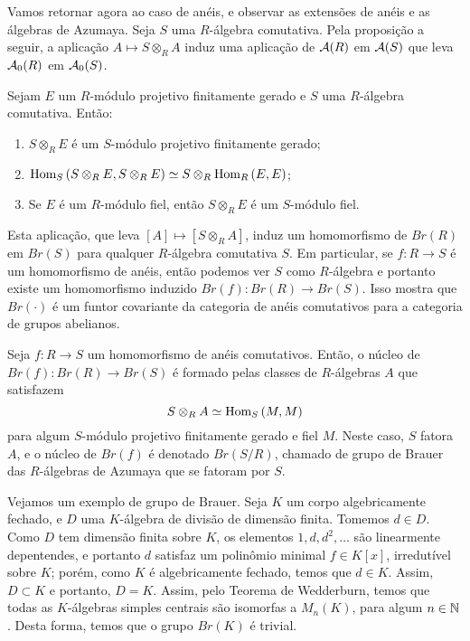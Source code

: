 Vamos retornar agora ao caso de anéis, e observar as extensões de anéis e as álgebras de Azumaya. Seja $S$ uma $R$-álgebra comutativa. Pela proposição a seguir, a aplicação $A\mapsto S\otimes_R A$ induz uma aplicação de $\mathcal{A}(R)$ em $\mathcal{A}(S)$ que leva $\mathcal{A}_0(R)$ em $\mathcal{A}_0(S)$.
\begin{prop}\cite[Proposition 5.5.]{brauer}
Sejam $E$ um $R$-módulo projetivo finitamente gerado e $S$ uma $R$-álgebra comutativa. Então:
\begin{enumerate}
    \item $S\otimes_R E$ é um $S$-módulo projetivo finitamente gerado;
    \item $\textrm{Hom}_{S}\left( S\otimes_R E,S\otimes_R E \right) \simeq S\otimes_R \textrm{Hom}_{R}\left( E,E \right)$;
    \item Se $E$ é um $R$-módulo fiel, então $S\otimes_R E$ é um $S$-módulo fiel.
\end{enumerate}
\end{prop}
Esta aplicação, que leva $[A]\mapsto [S\otimes_R A]$, induz um homomorfismo de $Br(R)$ em $Br(S)$ para qualquer $R$-álgebra comutativa $S$. Em particular, se $f: R \rightarrow S$ é um homomorfismo de anéis, então podemos ver $S$ como $R$-álgebra e portanto existe um homomorfismo induzido $Br(f): Br(R) \rightarrow Br(S)$. Isso mostra que $Br(\cdot)$ é um funtor covariante da categoria de anéis comutativos para a categoria de grupos abelianos. \par
Seja $f:R \rightarrow S$ um homomorfismo de anéis comutativos. Então, o núcleo de $Br(f): Br(R) \rightarrow Br(S)$ é formado pelas classes de $R$-álgebras $A$ que satisfazem \[S\otimes_R A \simeq \textrm{Hom}_{S}\left( M,M \right)\] para algum $S$-módulo projetivo finitamente gerado e fiel $M$. Neste caso, $S$ fatora $A$, e o núcleo de $Br(f)$ é denotado $Br(S/R)$, chamado de grupo de Brauer das $R$-álgebras de Azumaya que se fatoram por $S$. \par 
Vejamos um exemplo de grupo de Brauer. Seja $K$ um corpo algebricamente fechado, e $D$ uma $K$-álgebra de divisão de dimensão finita. Tomemos $d \in D$. Como $D$ tem dimensão finita sobre $K$, os elementos $1, d, d^2, \dots$ são linearmente depentendes, e portanto $d$ satisfaz um polinômio minimal $f \in K[x]$, irredutível sobre $K$; porém, como $K$ é algebricamente fechado, temos que $d \in K$. Assim, $D \subset K$ e portanto, $D=K$. Assim, pelo Teorema de Wedderburn, temos que todas as $K$-álgebras simples centrais são isomorfas a $M_n(K)$, para algum $n \in \mathbb{N}$. Desta forma, temos que o grupo $Br(K)$ é trivial. \par 
